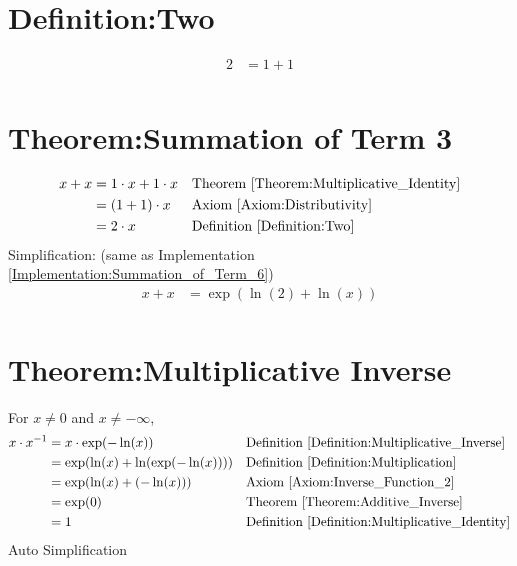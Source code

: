 \documentclass[12pt,a4paper]{report}
\begin{document}
\section{Definition:Two}
\label{Definition:Two}
\begin{align*}
2 &= 1+1 \\
\end{align*}

\section{Theorem:Summation of Term 3}
\label{Theorem:Summation_of_Term_3}
\begin{align*}
x + x
&= 1 \cdot x + 1 \cdot x
&& \text{Theorem \ref{Theorem:Multiplicative_Identity}} \\
&= (1+1) \cdot x
&& \text{Axiom \ref{Axiom:Distributivity}} \\
&= 2 \cdot x
&& \text{Definition \ref{Definition:Two}} \\
\end{align*}
Simplification: (same as Implementation \ref{Implementation:Summation_of_Term_6})
\begin{align*}
x + x &= \exp(\ln(2) + \ln(x)) \\
\end{align*}

\section{Theorem:Multiplicative Inverse}
\label{Theorem:Multiplicative_Inverse}
For $x \neq 0$ and $x \neq -\infty$,
\begin{align*}
x \cdot x^{-1}
&= x \cdot \exp(-\ln(x))
&& \text{Definition \ref{Definition:Multiplicative_Inverse}} \\
&= \exp( \ln(x) + \ln(\exp(-\ln(x))) )
&& \text{Definition \ref{Definition:Multiplication}} \\
&= \exp( \ln(x) + (-\ln(x)) )
&& \text{Axiom \ref{Axiom:Inverse_Function_2}} \\
&= \exp(0)
&& \text{Theorem \ref{Theorem:Additive_Inverse}} \\
&= 1
&& \text{Definition \ref{Definition:Multiplicative_Identity}} \\
\end{align*}
Auto Simplification
\end{document}
